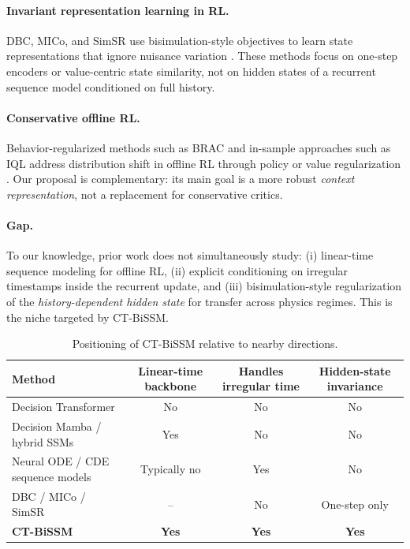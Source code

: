 \documentclass[11pt]{article}
\begin{document}
\paragraph{Invariant representation learning in RL.}
DBC, MICo, and SimSR use bisimulation-style objectives to learn state representations that ignore nuisance variation \cite{zhang2020dbc, castro2021mico, zhu2022simsr}. These methods focus on one-step encoders or value-centric state similarity, not on hidden states of a recurrent sequence model conditioned on full history.

\paragraph{Conservative offline RL.}
Behavior-regularized methods such as BRAC and in-sample approaches such as IQL address distribution shift in offline RL through policy or value regularization \cite{wu2019brac, kostrikov2022iql}. Our proposal is complementary: its main goal is a more robust \emph{context representation}, not a replacement for conservative critics.

\paragraph{Gap.}
To our knowledge, prior work does not simultaneously study: (i) linear-time sequence modeling for offline RL, (ii) explicit conditioning on irregular timestamps inside the recurrent update, and (iii) bisimulation-style regularization of the \emph{history-dependent hidden state} for transfer across physics regimes. This is the niche targeted by CT-BiSSM.

\begin{table}[t]
\centering
\caption{Positioning of CT-BiSSM relative to nearby directions.}
\label{tab:positioning}
\renewcommand{\arraystretch}{1.15}
\begin{tabular}{lccc}
\toprule
Method & Linear-time backbone & Handles irregular time & Hidden-state invariance \\
\midrule
Decision Transformer & No & No & No \\
Decision Mamba / hybrid SSMs & Yes & No & No \\
Neural ODE / CDE sequence models & Typically no & Yes & No \\
DBC / MICo / SimSR & -- & No & One-step only \\
\textbf{CT-BiSSM} & \textbf{Yes} & \textbf{Yes} & \textbf{Yes} \\
\bottomrule
\end{tabular}
\end{table}
\end{document}
